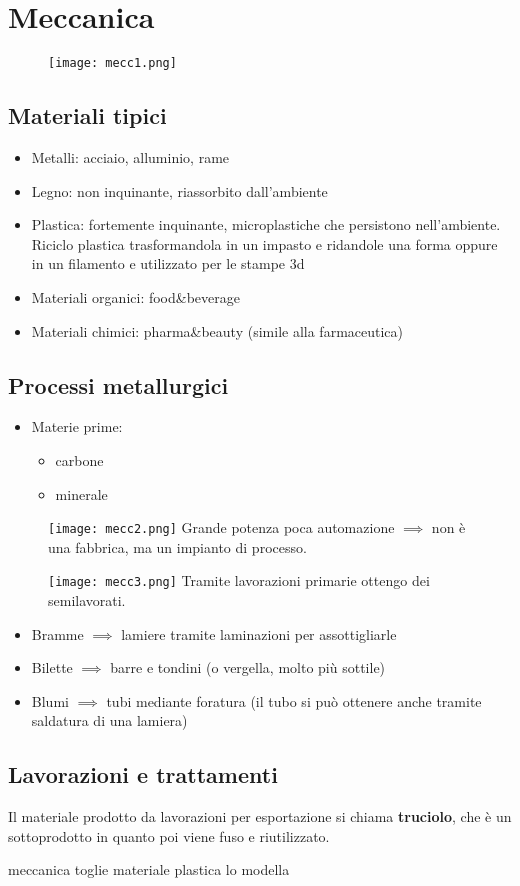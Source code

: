 \documentclass[../main.tex]{subfiles}
\begin{document}
\section{Meccanica}
\begin{figure}
    \centering
    \texttt{[image: mecc1.png]}
\end{figure}
\subsection{Materiali tipici}
\begin{itemize}
    \item Metalli: acciaio, alluminio, rame
    \item Legno: non inquinante, riassorbito dall'ambiente
    \item Plastica: fortemente inquinante, microplastiche che persistono nell'ambiente. Riciclo plastica trasformandola in un impasto e ridandole una forma oppure in un filamento e utilizzato per le stampe 3d
    \item Materiali organici: food\&beverage
    \item Materiali chimici: pharma\&beauty (simile alla farmaceutica)
\end{itemize}
\subsection{Processi metallurgici}
\begin{itemize}
    \item Materie prime: \begin{itemize}
        \item carbone
        \item minerale
    \end{itemize}
\end{itemize}
\begin{figure}
    \centering
    \texttt{[image: mecc2.png]}
    Grande potenza poca automazione $\implies$ non è una fabbrica, ma un impianto di processo.
\end{figure}
\begin{figure}
    \centering
    \texttt{[image: mecc3.png]}
    Tramite lavorazioni primarie ottengo dei semilavorati.
\end{figure}
\begin{itemize}
    \item Bramme $\implies$ lamiere tramite laminazioni per assottigliarle
    \item Bilette $\implies$ barre e tondini (o vergella, molto più sottile)
    \item Blumi $\implies$ tubi mediante foratura (il tubo si può ottenere anche tramite saldatura di una lamiera)
\end{itemize}
\subsection{Lavorazioni e trattamenti}
Il materiale prodotto da lavorazioni per esportazione si chiama \textbf{truciolo}, che è un sottoprodotto in quanto poi viene fuso e riutilizzato.

meccanica toglie materiale
plastica lo modella
\end{document}

